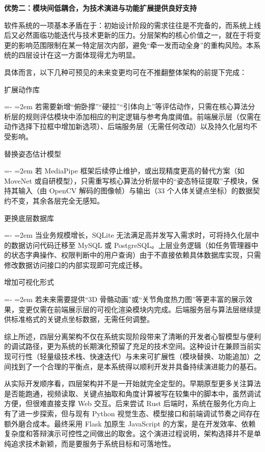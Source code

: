 \documentclass[UTF8,twoside]{ctexrep}
\makeatletter
\def@NAT@last@yr{\@citea}%
\def@NAT@last@yr{-\NAT@penalty}%
\newcommand{\researchitem}[2]{%
  \item #1%
  \par\begingroup
    \leftskip=-\leftmargin
    \rightskip=0pt
    \parindent=2em
    \noindent\hspace*{2em}\ignorespaces#2\unskip\par
  \endgroup
}
\makeatother
\begin{document}
\textbf{优势二：模块间低耦合，为技术演进与功能扩展提供良好支持}

软件系统的一项基本矛盾在于：初始设计阶段的需求往往是不完备的，而系统上线后又必然面临功能迭代与技术更新的压力。分层架构的核心价值之一，就在于将变更的影响范围限制在某一特定层次内部，避免“牵一发而动全身”的重构风险。本系统的四层设计在这一方面体现得尤为明显。

具体而言，以下几种可预见的未来变更均可在不推翻整体架构的前提下完成：

\begin{researchlist}
  
\researchitem{扩展动作库}{若需要新增“俯卧撑”“硬拉”“引体向上”等评估动作，只需在核心算法分析层的规则评估模块中添加相应的判定逻辑与参考角度阈值。前端展示层（仅需在动作选择下拉框中增加新选项）、后端服务层（无需任何改动）以及持久化层均不受影响。}

  
\researchitem{替换姿态估计模型}{若 MediaPipe 框架后续停止维护，或出现精度更高的替代方案（如 MoveNet 或自研模型），只需重写核心算法分析层中的“姿态特征提取”子模块，保持其输入（由 OpenCV 解码的图像帧）与输出（33 个人体关键点坐标）的数据契约不变，其余各层完全无感知。}

  
\researchitem{更换底层数据库}{当业务规模增长，SQLite 无法满足高并发写入需求时，可将持久化层中的数据访问代码迁移至 MySQL 或 PostgreSQL。上层业务逻辑（如任务管理器中的状态字典操作、权限判断中的用户查询）由于不直接依赖具体数据库实现，只需修改数据访问接口的内部实现即可完成迁移。}

  
\researchitem{增加可视化形式}{若未来需要提供“3D 骨骼动画”或“关节角度热力图”等更丰富的展示效果，变更仅需在前端展示层的可视化渲染模块内完成。后端服务层与算法层继续提供标准格式的关键点坐标数据，无需任何调整。}
\end{researchlist}

综上所述，四层分离架构不仅在系统实现阶段带来了清晰的开发者心智模型与便利的调试路径，更为系统的长期演化预留了充足的技术空间。这种设计在兼顾当前实现可行性（轻量级技术栈、快速迭代）与未来可扩展性（模块替换、功能追加）之间找到了一个合理的平衡点，是本系统得以顺利开发并具备持续演进能力的基石。

从实际开发顺序看，四层架构并不是一开始就完全定型的。早期原型更多关注算法是否能跑通，视频读取、关键点抽取和角度计算被写在较集中的脚本中，虽然调试方便，但很难直接支撑 Web 交互。后来尝试 Rust 后端时，系统在服务化方向上有了进一步探索，但与现有 Python 视觉生态、模型接口和前端调试节奏之间存在额外磨合成本。最终采用 Flask 加原生 JavaScript 的方案，是在开发效率、依赖复杂度和答辩演示可控性之间做出的取舍。这个演进过程说明，架构选择并不是单纯追求技术新颖，而是要服务于系统目标和可落地性。
\end{document}
